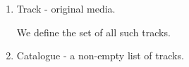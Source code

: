 \documentclass[11pt]{article}
\begin{document}
\begin{enumerate}

\item \textsf{Track} - original media.

We define the set of all such tracks.

\begin{flushright}
  \begin{tikzpicture}
    
  \end{tikzpicture}
\end{flushright}

\begin{zed}
[Track]  
\end{zed}







\item \textsf{Catalogue} - a non-empty list of tracks.


\begin{flushright}
\end{flushright}


\end{enumerate}
\end{document}
